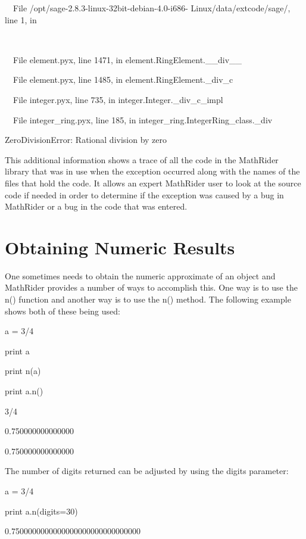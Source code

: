 \documentclass[12pt,oneside]{book}
\begin{document}
\ \ File {\textquotedbl}/opt/sage{}-2.8.3{}-linux{}-32bit{}-debian{}-4.0{}-i686{}- Linux/data/extcode/sage/{\textquotedbl}, line 1, in 

\ \ \ \ 

\ \ File {\textquotedbl}element.pyx{\textquotedbl}, line 1471, in element.RingElement.\_\_div\_\_

\ \ File {\textquotedbl}element.pyx{\textquotedbl}, line 1485, in element.RingElement.\_div\_c

\ \ File {\textquotedbl}integer.pyx{\textquotedbl}, line 735, in integer.Integer.\_div\_c\_impl

\ \ File {\textquotedbl}integer\_ring.pyx{\textquotedbl}, line 185, in integer\_ring.IntegerRing\_class.\_div

ZeroDivisionError: Rational division by zero

This additional information shows a trace of all the code in the MathRider library that was in use when the exception occurred along with the names of the files that hold the code. It allows an expert MathRider user to look at the source code if needed in order to determine if the exception was caused by a bug in MathRider or a bug in the code that was entered.

\section[Obtaining Numeric Results]{Obtaining Numeric Results}

One sometimes needs to obtain the numeric approximate of an object and MathRider provides a number of ways to accomplish this. One way is to use the n() function and another way is to use the n() method. The following example shows both of these being used: 

a = 3/4

print a

print n(a)

print a.n()

{\textbar}

3/4

0.750000000000000

0.750000000000000

The number of digits returned can be adjusted by using the digits parameter: 

a = 3/4

print a.n(digits=30)

{\textbar}

0.7500000000000000000000000000000
\end{document}
